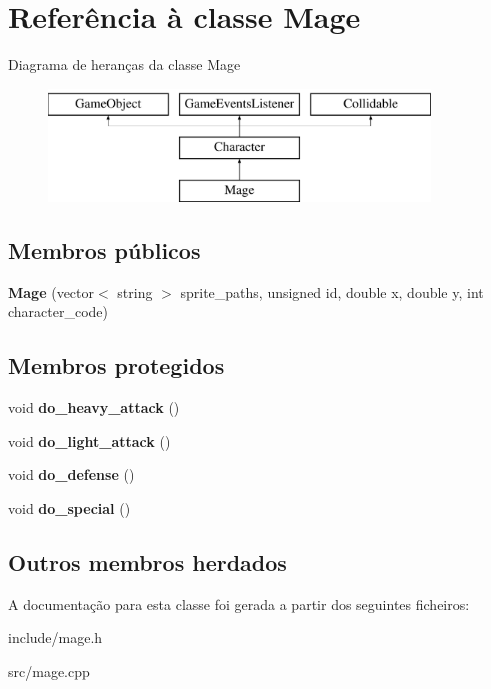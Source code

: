 \hypertarget{classMage}{}\section{Referência à classe Mage}
\label{classMage}
Diagrama de heranças da classe Mage\begin{figure}[H]
\begin{center}
\leavevmode
\includegraphics[height=3.000000cm]{classMage}
\end{center}
\end{figure}
\subsection*{Membros públicos}
\begin{DoxyCompactItemize}
\item 
\mbox{\label{classMage_a691d8def05ca8cbda1a2b9229c52748b}} 
{\bfseries Mage} (vector$<$ string $>$ sprite\+\_\+paths, unsigned id, double x, double y, int character\+\_\+code)
\end{DoxyCompactItemize}
\subsection*{Membros protegidos}
\begin{DoxyCompactItemize}
\item 
\mbox{\label{classMage_a83840130ab4e67e41f3a1fd435e55f9c}} 
void {\bfseries do\+\_\+heavy\+\_\+attack} ()
\item 
\mbox{\label{classMage_abf137f2de54b6ba08fb12805ff00ec6d}} 
void {\bfseries do\+\_\+light\+\_\+attack} ()
\item 
\mbox{\label{classMage_a0ce2899b0e49e1bbe47c04149f307218}} 
void {\bfseries do\+\_\+defense} ()
\item 
\mbox{\label{classMage_aae5afc391b9d8105cfa98ca2f3a1646b}} 
void {\bfseries do\+\_\+special} ()
\end{DoxyCompactItemize}
\subsection*{Outros membros herdados}


A documentação para esta classe foi gerada a partir dos seguintes ficheiros\+:\begin{DoxyCompactItemize}
\item 
include/mage.\+h\item 
src/mage.\+cpp\end{DoxyCompactItemize}
